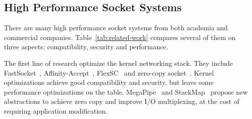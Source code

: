 





\subsection{High Performance Socket Systems}
\label{subsec:related-work}


There are many high performance socket systems from both academia and commercial companies.
Table~\ref{tab:related-work} compares several of them on three aspects: compatibility, security and performance.  

The first line of research optimize the kernel networking stack. They include FastSocket~\cite{lin2016scalable}, Affinity-Accept~\cite{pesterev2012improving}, FlexSC~\cite{soares2010flexsc} and zero-copy socket~\cite{thadani1995efficient,chu1996zero,linux-zero-copy}.
Kernel optimizations achieve good compatibility and security, but leave some performance optimizations on the table.
MegaPipe~\cite{han2012megapipe} and StackMap~\cite{yasukata2016stackmap} propose new abstractions to achieve zero copy and improve I/O multiplexing, at the cost of requiring application modification.

